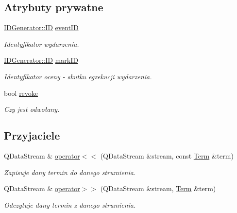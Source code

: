 \subsection*{Atrybuty prywatne}
\begin{DoxyCompactItemize}
\item 
\hyperlink{classIDGenerator_1_1ID}{IDGenerator::ID} \hyperlink{classTerm_acc86c9d25865449a551947aa1597dec5}{eventID}
\begin{DoxyCompactList}\small\item\em Identyfikator wydarzenia. \item\end{DoxyCompactList}\item 
\hyperlink{classIDGenerator_1_1ID}{IDGenerator::ID} \hyperlink{classTerm_a59508892d24fb82de0db91a377c690fb}{markID}
\begin{DoxyCompactList}\small\item\em Identyfikator oceny -\/ skutku egzekucji wydarzenia. \item\end{DoxyCompactList}\item 
bool \hyperlink{classTerm_a58a815dca7217ba0e9e4e084d7c91648}{revoke}
\begin{DoxyCompactList}\small\item\em Czy jest odwołany. \item\end{DoxyCompactList}\end{DoxyCompactItemize}
\subsection*{Przyjaciele}
\begin{DoxyCompactItemize}
\item 
QDataStream \& \hyperlink{classTerm_a607138da9b016f91528f99ab09407712}{operator$<$$<$} (QDataStream \&stream, const \hyperlink{classTerm}{Term} \&term)
\begin{DoxyCompactList}\small\item\em Zapisuje dany termin do danego strumienia. \item\end{DoxyCompactList}\item 
QDataStream \& \hyperlink{classTerm_ad3ecfcfe45e8df9b765a1b06be05a457}{operator$>$$>$} (QDataStream \&stream, \hyperlink{classTerm}{Term} \&term)
\begin{DoxyCompactList}\small\item\em Odczytuje dany termin z danego strumienia. \item\end{DoxyCompactList}\end{DoxyCompactItemize}


